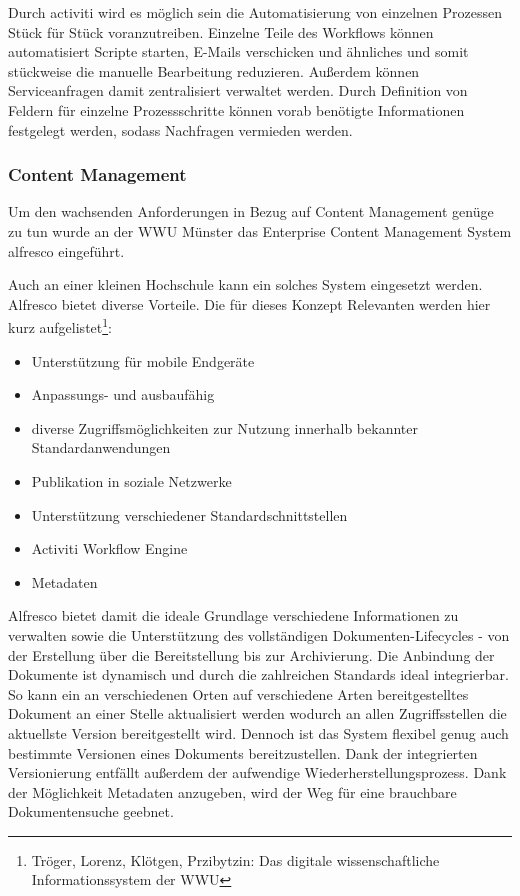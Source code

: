 \documentclass[a4paper]{article}
\newcommand\liststyleLi{%
\renewcommand\labelitemi{•}
\renewcommand\labelitemii{◦}
\renewcommand\labelitemiii{${\blacksquare}$}
\renewcommand\labelitemiv{•}
}
\begin{document}
{\sffamily
Durch activiti wird es möglich sein die Automatisierung von einzelnen Prozessen Stück für Stück voranzutreiben. Einzelne
Teile des Workflows können automatisiert Scripte starten, E-Mails verschicken und ähnliches und somit stückweise die
manuelle Bearbeitung reduzieren. Außerdem können Serviceanfragen damit zentralisiert verwaltet werden. Durch Definition
von Feldern für einzelne Prozessschritte können vorab benötigte Informationen festgelegt werden, sodass Nachfragen
vermieden werden.}

\clearpage\subsubsection{Content Management}
{\sffamily
Um den wachsenden Anforderungen in Bezug auf Content Management genüge zu tun wurde an der WWU Münster das Enterprise
Content Management System alfresco eingeführt.}

{\sffamily
Auch an einer kleinen Hochschule kann ein solches System eingesetzt werden. Alfresco bietet diverse Vorteile. Die für
dieses Konzept Relevanten werden hier kurz aufgelistet\footnote{Tröger, Lorenz, Klötgen, Przibytzin: Das digitale
wissenschaftliche Informationssystem der WWU}:}

\liststyleLi
\begin{itemize}
\item {\sffamily
Unterstützung für mobile Endgeräte}
\item {\sffamily
Anpassungs- und ausbaufähig}
\item {\sffamily
diverse Zugriffsmöglichkeiten zur Nutzung innerhalb bekannter Standardanwendungen}
\item {\sffamily
Publikation in soziale Netzwerke}
\item {\sffamily
Unterstützung verschiedener Standardschnittstellen}
\item {\sffamily
Activiti Workflow Engine}
\item {\sffamily
Metadaten}
\end{itemize}
{\sffamily
Alfresco bietet damit die ideale Grundlage verschiedene Informationen zu verwalten sowie die Unterstützung des
vollständigen Dokumenten-Lifecycles - von der Erstellung über die Bereitstellung bis zur Archivierung. Die Anbindung
der Dokumente ist dynamisch und durch die zahlreichen Standards ideal integrierbar. So kann ein an verschiedenen Orten
auf verschiedene Arten bereitgestelltes Dokument an einer Stelle aktualisiert werden wodurch an allen Zugriffsstellen
die aktuellste Version bereitgestellt wird. Dennoch ist das System flexibel genug auch bestimmte Versionen eines
Dokuments bereitzustellen. Dank der integrierten Versionierung entfällt außerdem der aufwendige
Wiederherstellungsprozess. Dank der Möglichkeit Metadaten anzugeben, wird der Weg für eine brauchbare Dokumentensuche
geebnet.}
\end{document}
